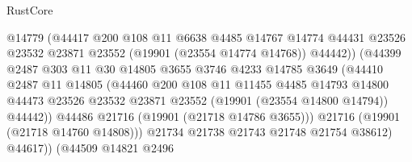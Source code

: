 \begin{lexlean}{RustCore}
\begin{coremodule}
                                  @14779
                                  (@44417
                                    @200
                                    @108
                                    @11
                                    @6638
                                    @4485
                                    @14767
                                    @14774
                                    @44431
                                    @23526
                                    @23532
                                    @23871
                                    @23552
                                    (@19901 (@23554 @14774 @14768))
                                    @44442))
                                (@44399
                                  @2487
                                  @303
                                  @11
                                  @30
                                  @14805
                                  @3655
                                  @3746
                                  @4233
                                  @14785
                                  @3649
                                  (@44410
                                    @2487
                                    @11
                                    @14805
                                    (@44460
                                      @200
                                      @108
                                      @11
                                      @11455
                                      @4485
                                      @14793
                                      @14800
                                      @44473
                                      @23526
                                      @23532
                                      @23871
                                      @23552
                                      (@19901 (@23554 @14800 @14794))
                                      @44442))
                                  @44486
                                  @21716
                                  (@19901 (@21718 @14786 @3655)))
                                @21716
                                (@19901 (@21718 @14760 @14808)))
                              @21734
                              @21738
                              @21743
                              @21748
                              @21754
                              @38612)
                            @44617))
                        (@44509
                          @14821
                          @2496

\end{coremodule}
\end{lexlean}

